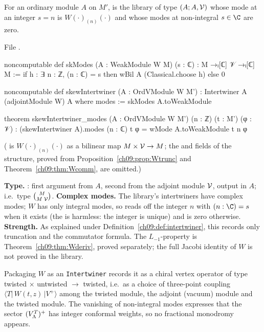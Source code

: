 \begin{definition}\label{ch09:def:skewInt}
For an ordinary module $A$ on $M'$,  is the library 
of type $(A;A,\mathcal{V})$ whose mode at an integer $s=n$ is $W(\cdot)_{(n)}(\cdot)$ and whose modes
at non-integral $s\in\C$ are zero.
\end{definition}
\noindent File .
\begin{leancode}
noncomputable def skModes (A : WeakModule W M) (s : ℂ) : M →ₗ[ℂ] 𝒱 →ₗ[ℂ] M :=
  if h : ∃ n : ℤ, (n : ℂ) = s then wBil A (Classical.choose h) else 0

noncomputable def skewIntertwiner (A : OrdVModule W M') :
    Intertwiner A (adjointModule W) A where
  modes := skModes A.toWeakModule

theorem skewIntertwiner_modes (A : OrdVModule W M') (n : ℤ) (t : M') (φ : 𝒱) :
    (skewIntertwiner A).modes (n : ℂ) t φ = wMode A.toWeakModule t n φ
\end{leancode}
( is $W(\cdot)_{(n)}(\cdot)$ as a bilinear map $M\times\mathcal{V}\to M$; the
 and  fields of the structure, proved from
Proposition~\ref{ch09:prop:Wtrunc} and Theorem~\ref{ch09:thm:Wcomm}, are omitted.)

\begin{dictionary}
\textbf{Type.} : first argument from $A$, second from the
adjoint module $\mathcal{V}$, output in $A$; i.e.\ type $\binom{M}{M\;\mathcal{V}}$.
\textbf{Complex modes.} The library's intertwiners have complex modes; $W$ has only integral modes,
so  reads off the integer $n$ with $(n:\C)=s$ when it exists (the
 is harmless: the integer is unique) and is zero otherwise.
\textbf{Strength.} As explained under Definition~\ref{ch09:def:intertwiner}, this records only
truncation and the commutator formula. The $L_{-1}$-property is Theorem~\ref{ch09:thm:Wderiv},
proved separately; the full Jacobi identity of $W$ is not proved in the library.
\end{dictionary}

\begin{physics}
Packaging $W$ as an \texttt{Intertwiner} records it as a chiral vertex operator of type twisted $\times$ untwisted $\to$ twisted, i.e.\ as a choice of three-point coupling $\langle T|\,W(t,z)\,|V^+\rangle$ among the twisted module, the adjoint (vacuum) module and the twisted module. The vanishing of non-integral modes expresses that the sector $(V_{\Lambda}^{T})^{+}$ has integer conformal weights, so no fractional monodromy appears.
\end{physics}

